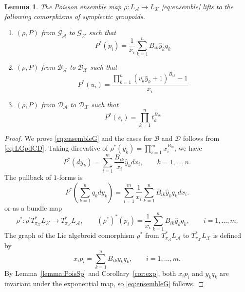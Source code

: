 \documentclass{amsart}
\newtheorem{lemma}[theorem]{Lemma}
\numberwithin{equation}{section}
\newcommand{\cA}{\mathcal{A}}
\newcommand{\cB}{\mathcal{B}}
\newcommand{\cD}{\mathcal{D}}
\newcommand{\cG}{\mathcal{G}}
\newcommand{\cX}{\mathcal{X}}
\begin{document}
\begin{lemma}
  The Poisson ensemble map $\rho:L_\cA\to L_\cX$ \eqref{eq:ensemble} lifts to the following comorphisms of symplectic groupoids.
	\begin{enumerate}
		\item $(\rho, P)$ from $\cG_\cA$ to $\cG_\cX$ such that
		\begin{equation} \label{eq:ensembleG}
			P^*\left(p_i\right) = \frac{1}{x_i}\sum_{k=1}^n B_{ik} \hat{y}_k q_k
		\end{equation}
		\item $(\rho, P)$ from $\cB_\cA$ to $\cB_\cX$ such that
		\[
			P^*\left(u_i\right) = \frac{\prod_{k=1}^n (v_k\hat{y}_k+1)^{B_{ik}} - 1}{x_i}
		\]
		\item $(\rho, P)$ from $\cD_\cA$ to $\cD_\cX$ such that
		\[
			P^*\left(s_i \right) = \prod_{k=1}^n t_k^{B_{ik}}
		\]
	\end{enumerate}
\end{lemma}
\begin{proof}
	We prove \eqref{eq:ensembleG} and the cases for $\cB$ and $\cD$ follows from \eqref{eq:LGpdCD}. Taking direvative of $\rho^*(y_k) = \prod_{i=1}^m x_i^{B_{ik}}$, we have
	\[
		P^* \left( dy_k \right) = \sum_{i=1}^m \frac{B_{ik}}{x_i} \hat{y}_k dx_i, \qquad k = 1, \ldots, n.
	\]
The pullback of $1$-forms is
	\[
		P^* \left( \sum_{k=1}^n q_k dy_k \right) = \sum_{i=1}^m \frac{1}{x_i} \sum_{k=1}^n B_{ik} \hat{y}_k q_k dx_i.
	\]
or as a bundle map
	\[
		\rho^*: \rho^! T^*_{\pi_\cX} L_\cX \to T^*_{\pi_\cA} L_\cA, \qquad (\rho^*)^*(p_i) = \frac{1}{x_i} \sum_{k=1}^n B_{ik} \hat{y}_k q_k, \qquad i = 1, \ldots, m.
	\]
The graph of the Lie algebroid comorphism $\rho^*$ from $T^*_{\pi_\cA} L_\cA$ to $T^*_{\pi_\cX} L_\cX$ is defined by
	\[
		x_i p_i =  \sum_{k=1}^n B_{ik} y_k q_k, \qquad i = 1, \ldots, m.
	\]
By Lemma~\ref{lemma:PoisSp} and Corollary~\ref{cor:exp}, both $x_i p_i$ and $y_k q_k$ are invariant under the exponential map, so \eqref{eq:ensembleG} follows.
\end{proof}
\end{document}
